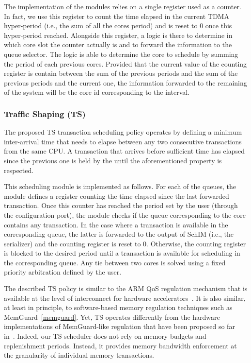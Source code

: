 The implementation of the modules relies on a single register used as
a counter. In fact, we use this register to count the time elapsed in
the current TDMA hyper-period (i.e., the sum of all the cores period)
and is reset to 0 once this hyper-period reached. Alongside this
register, a logic is there to determine in which core slot the counter
actually is and to forward the information to the queue selector. The
logic is able to determine the core to schedule by summing the period
of each previous cores. Provided that the current value of the
counting register is contain between the sum of the previous periods
and the sum of the previous periods and the current one, the
information forwarded to the remaining of the system will be the core
id corresponding to the interval.  

\subsubsection{Traffic Shaping (TS)}
The proposed TS transaction scheduling policy operates by defining a
minimum inter-arrival time that needs to elapse between any two
consecutive transactions from the same CPU. A transaction that arrives
before sufficient time has elapsed since the previous one is held by
the \schim until the aforementioned property is respected.

This scheduling module is implemented as follows. For each of the
\schim queues, the module defines a register counting the time elapsed
since the last forwarded transaction. Once this counter has reached
the period set by the user (through the configuration port), the
module checks if the queue corresponding to the core contains any
transaction. In the case where a transaction is available in the
corresponding queue, the latter is forwarded to the output of SchIM
(i.e., the serializer) and the counting register is reset to
0. Otherwise, the counting register is blocked to the desired period
until a transaction is available for scheduling in the corresponding
queue. Any tie between two cores is solved using a fixed priority
arbitration defined by the user.

The described TS policy is similar to the ARM QoS regulation mechanism
that is available at the level of interconnect for hardware
accelerators~\cite{QoS-301, QoS-400, ewarp_rtss20}. It is also
similar, at least in principle, to software-based memory regulation
techniques such as MemGuard~\ref{memguard}. Yet, TS operates
differently from the hardware implementations of MemGuard-like
regulation that have been proposed so far in~\cite{MITTS,
  Farshchi2020BRUBR}. Indeed, our TS scheduler does not rely on memory
budgets and replenishment periods. Instead, it provides memory
bandwidth enforcement at the granularity of individual memory
transactions.

